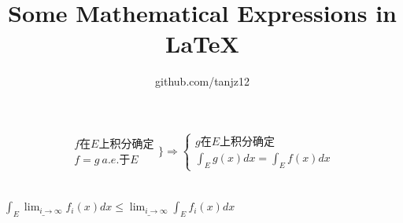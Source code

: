 \documentclass{article}
\title{Some Mathematical Expressions in LaTeX}
\author{github.com/tanjz12}
\begin{document}
\maketitle

\section{}

$$\begin{matrix}
f在E上积分确定\\
f=g\ a.e.于E
\end{matrix}
\Bigg\}
\Rightarrow
\begin{cases}
g在E上积分确定\\
\int_E g(x)dx=\int_E f(x)dx
\end{cases}$$

\section{}

$\int_E \underline{\displaystyle\lim_{i\rightarrow\infty}}f_i(x)dx\leq \underline{\displaystyle\lim_{i\rightarrow\infty}}\int_E f_i(x)dx$
\end{document}
